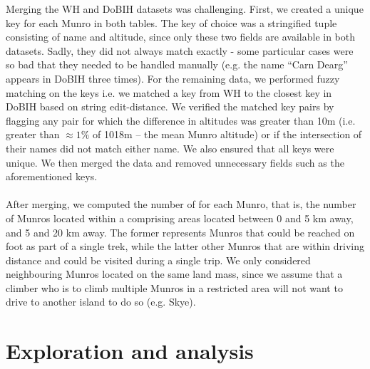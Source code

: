 \documentclass[11pt,a4paper]{article}
\begin{document}
Merging the WH and DoBIH datasets was challenging. First, we created a unique key for each Munro in both tables. The key of choice was a stringified tuple consisting of name and altitude, since only these two fields are available in both datasets. Sadly, they did not always match exactly - some particular cases were so bad that they needed to be handled manually (e.g. the name “Carn Dearg” appears in DoBIH three times). For the remaining data, we performed fuzzy matching on the keys i.e. we matched a key from WH to the closest key in DoBIH based on string edit-distance. We verified the matched key pairs by flagging any pair for which the difference in altitudes was greater than 10m (i.e. greater than $\approx1\%$ of 1018m – the mean Munro altitude) or if the intersection of their names did not match either name. We also ensured that all keys were unique. We then merged the data and removed unnecessary fields such as the aforementioned keys. \\ \\
After merging, we computed the number of  for each Munro, that is, the number of Munros located within a  comprising areas located between 0 and 5 km away, and 5 and 20 km away. The former represents Munros that could be reached on foot as part of a single trek, while the latter other Munros that are within driving distance and could be visited during a single trip. We only considered neighbouring Munros located on the same land mass, since we assume that a climber who is to climb multiple Munros in a restricted area will not want to drive to another island to do so (e.g. Skye).


\section{Exploration and  analysis}


\end{document}
